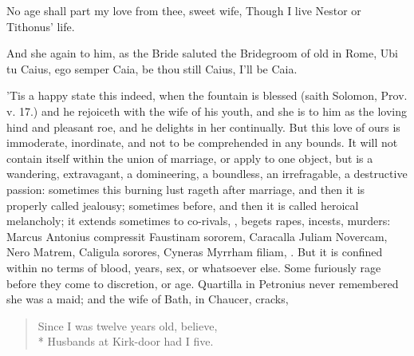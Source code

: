 {No age shall part my love from thee, sweet wife,
Though I live Nestor or Tithonus' life.

And she again to him, as the Bride saluted the Bridegroom of old
in Rome, Ubi tu Caius, ego semper Caia, be thou still Caius, I'll be
Caia.

'Tis a happy state this indeed, when the fountain is blessed (saith
Solomon, Prov. v. 17.) and he rejoiceth with the wife of his youth, and
she is to him as the loving hind and pleasant roe, and he delights in
her continually. But this love of ours is immoderate, inordinate, and
not to be comprehended in any bounds. It will not contain itself within
the union of marriage, or apply to one object, but is a wandering,
extravagant, a domineering, a boundless, an irrefragable, a destructive
passion: sometimes this burning lust rageth after marriage, and then it
is properly called jealousy; sometimes before, and then it is called
heroical melancholy; it extends sometimes to co-rivals, \etc{}, begets
rapes, incests, murders: Marcus Antonius compressit Faustinam sororem,
Caracalla Juliam Novercam, Nero Matrem, Caligula sorores, Cyneras
Myrrham filiam, \etc{}. But it is confined within no terms of blood, years,
sex, or whatsoever else. Some furiously rage before they come to
discretion, or age. Quartilla in Petronius never remembered she
was a maid; and the wife of Bath, in Chaucer, cracks,

{\gothfont
\begin{verse}
Since I was twelve years old, believe,\\*
Husbands at Kirk-door had I five.
\end{verse}}

}
